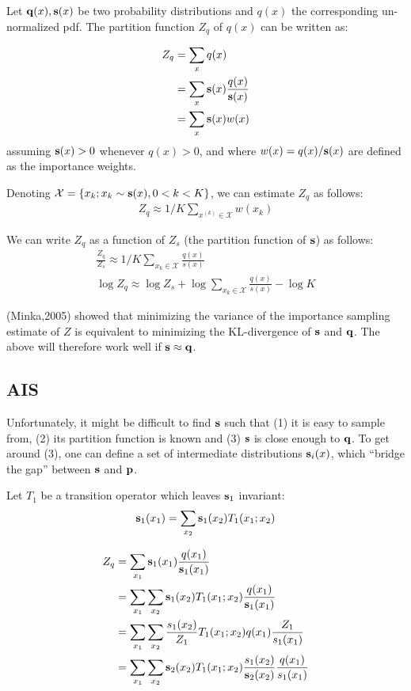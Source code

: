\documentclass{article}
\begin{document}
Let $\mathbf{q}(x), {\mathbf{s}}(x)$ be two probability distributions and $q(x)$ the
corresponding un-normalized pdf. The partition function $Z_q$ of $q(x)$ can be
written as:

\begin{align}
    Z_q &= \sum_x q(x) \\
        &= \sum_x {\mathbf{s}}(x) \frac{q(x)}{{\mathbf{s}}(x)} \\
        &= \sum_x {\mathbf{s}}(x) w(x) 
\end{align}
assuming ${\mathbf{s}}(x) > 0$ whenever $q(x) > 0$, and where $w(x) = q(x)/{\mathbf{s}}(x)$ are
defined as the importance weights.
\bigskip

Denoting $\mathcal{X} = \{x_k; x_k \sim \mathbf{s}(x), 0 < k < K \}$, we can estimate $Z_q$ as follows:
\begin{align}
    Z_q \approx 1/K \sum_{x^{(k)} \in \mathcal{X}} w(x_k)
\end{align}

We can write $Z_q$ as a function of $Z_s$ (the partition function of $\mathbf{s}$) as follows:
\begin{align}
    \label{eq:importance}
    \frac{Z_q}{Z_s} \approx 1/K \sum_{x_k \in \mathcal{X}} \frac{q(x)}{s(x)}  \\
    \label{eq:importance}
    \log Z_q \approx \log Z_s + \log \sum_{x_k \in \mathcal{X}} \frac{q(x)}{s(x)} - \log K
\end{align}
\bigskip


(Minka,2005) showed that minimizing the variance of the importance sampling
estimate of $Z$ is equivalent to minimizing the KL-divergence of ${\mathbf{s}}$ and
${\mathbf{q}}$.  The above will therefore work well if $\mathbf{s} \approx \mathbf{q}$.

\subsection{AIS}

Unfortunately, it might be difficult to find $\mathbf{s}$ such that (1) it is easy to
sample from, (2) its partition function is known and (3) $\mathbf{s}$ is close enough to
$\mathbf{q}$. To get around (3), one can define a set of intermediate distributions
$\mathbf{s}_i(x)$, which ``bridge the gap'' between $\mathbf{s}$ and $\mathbf{p}$.  \bigskip

Let $T_1$ be a transition operator which leaves $\mathbf{s}_1$ invariant:
\begin{align}
    \mathbf{s}_1(x_1) = \sum_{x_2} \mathbf{s}_1(x_2) T_1(x_1; x_2)
\end{align}

\begin{align}
    Z_q &= \sum_{x_1} \mathbf{s}_1(x_1) \frac{q(x_1)}{\mathbf{s}_1(x_1)} \\
        &= \sum_{x_1} \sum_{x_2} \mathbf{s}_1(x_2) T_1(x_1; x_2) \frac{q(x_1)}{\mathbf{s}_1(x_1)} \\
        &= \sum_{x_1} \sum_{x_2} 
            \frac{s_1(x_2)}{Z_1} T_1(x_1; x_2) q(x_1) \frac{Z_1}{s_1(x_1)} \\
        &= \sum_{x_1} \sum_{x_2} 
           \mathbf{s}_2(x_2) T_1(x_1; x_2) \frac{s_1(x_2)}{\mathbf{s}_2(x_2)} \frac{q(x_1)}{s_1(x_1)}
\end{align}
\end{document}
